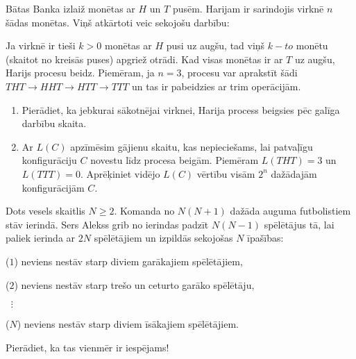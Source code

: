 



\renewcommand{\theenumi}{\alph{enumi}}



\noindent
 
\filbreak

\begin{problem}
Bātas Banka izlaiž monētas ar $H$ un $T$ pusēm. Harijam ir sarindojis virknē $n$ šādas monētas. Viņš atkārtoti veic sekojošu darbību:

Ja virknē ir tieši $k>0$ monētas ar $H$ pusi uz augšu, tad viņš $k-to$ monētu (skaitot no kreisās puses) apgriež otrādi. Kad visas monētas ir ar $T$ uz augšu, Harijs procesu beidz. Piemēram, ja $n=3$, procesu var aprakstīt šādi   $THT \rightarrow HHT \rightarrow HTT \rightarrow TTT$ un tas ir pabeidzies ar trim operācijām.
\begin {enumerate}
\item Pierādiet, ka jebkurai sākotnējai virknei, Harija process beigsies pēc galīga darbību skaita.
\item Ar $L(C)$ apzīmēsim gājienu skaitu, kas nepieciešams, lai patvaļīgu konfigurāciju $C$ novestu līdz procesa beigām. Piemēram $L(THT) = 3$ un  $L(TTT) = 0$. Aprēķiniet vidējo $L(C)$ vērtību visām $2^n$ dažādajām konfigurācijām $C$.
\end {enumerate}
\end{problem}

\begin{problem}
Dots vesels skaitlis $N \ge 2$. Komanda no $N(N + 1)$ dažāda auguma futbolistiem stāv ierindā. Sers Alekss grib no ierindas padzīt $N(N - 1)$ spēlētājus tā, lai paliek ierinda ar $2N$ spēlētājiem un izpildās sekojošas $N$ īpašības:

($1$) neviens nestāv starp diviem garākajiem spēlētājiem,

($2$) neviens nestāv starp trešo un ceturto garāko spēlētāju,

$\;\;\vdots$

($N$) neviens nestāv starp diviem īsākajiem spēlētājiem.

Pierādiet, ka tas vienmēr ir iespējams!


\end{problem}


